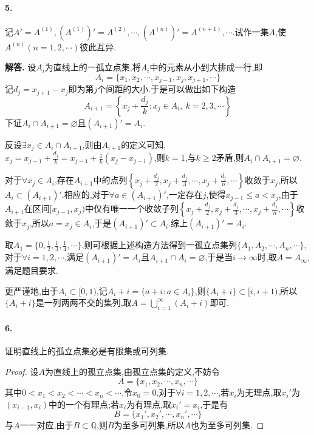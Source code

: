 \documentclass[12pt, a4paper, oneside]{ctexart}
\newenvironment{solution}{\par\noindent\textbf{解答. }}{\bigskip\par}
\begin{document}
\paragraph{5.}记$A'=A^{(1)},(A^{(1)})'=A^{(2)},\cdots,(A^{(n)})'=A^{(n+1)},\cdots$.试作一集$A$,使$A^{(n)}(n=1,2,\cdots)$彼此互异.
\def\disp{\displaystyle}
\begin{solution}
    设$A_i$为直线上的一孤立点集,将$A_i$中的元素从小到大排成一行,即
    \begin{equation*}
      A_i = \{x_1,x_2,\cdots,x_{j-1},x_j,x_{j+1},\cdots\}
    \end{equation*}
    记$d_j = x_{j+1}-x_j$即为第$j$个间距的大小.于是可以做出如下构造
    \begin{equation*}
        A_{i+1} = \left\{x_j+\frac{d_j}{k}:x_j\in A_i,\ k=2,3,\cdots\right\}
    \end{equation*}
    下证$A_i\cap A_{i+1} = \varnothing$且$(A_{i+1})' = A_i$.

    反设$\exists x_j\in A_i\cap A_{i+1}$,则由$A_{i+1}$的定义可知,\ $ x_j=x_{j-1}+\frac{d_j}{k}=x_{j-1}+\frac{1}{k}(x_j-x_{j-1})$,则$k=1$,与$k\geqslant 2$矛盾,则$A_i\cap A_{i+1} = \varnothing$.

    对于$\forall x_j\in A_i$,存在$A_{i+1}$中的点列$\left\{x_j+\frac{d_j}{2},x_j+\frac{d_j}{3},\cdots,x_j+\frac{d_j}{n},\cdots\right\}$收敛于$x_j$,所以$A_i\subset (A_{i+1})'$.相应的,对于$\forall a\in (A_{i+1})'$,一定存在$j$,使得$x_{j-1}\leqslant a < x_j$,由于$A_{i+1}$在区间$[x_{j-1},x_j)$中仅有唯一一个收敛子列$\left\{x_j+\frac{d_j}{2},x_j+\frac{d_j}{3},\cdots,x_j+\frac{d_j}{n},\cdots\right\}$收敛于$x_j$,所以$a = x_j\in A_i$,于是$(A_{i+1})' \subset A_i$.综上$(A_{i+1})' = A_i$.

    取$ A_1 = \{0, \frac{1}{2},\frac{1}{3},\frac{1}{4},\cdots\}$,则可根据上述构造方法得到一孤立点集列$\{A_1,A_2,\cdots, A_n,\cdots\}$,对于$\forall i = 1,2,\cdots$,满足$(A_{i+1})'=A_i$且$A_{i+1}\cap A_i = \varnothing$,于是当$i\rightarrow \infty$时,取$A = A_{\infty}$,满足题目要求.

    更严谨地,由于$A_i\subset [0,1)$,记$A_i+i = \{a+i:a\in A_i\}$,则$\{A_i+i\}\subset [i, i+1)$,所以$\{A_i+i\}$是一列两两不交的集列,取$\disp A = \bigcup_{i=1}^{\infty}(A_i+i)$即可.
\end{solution}
\paragraph{6.}证明直线上的孤立点集必是有限集或可列集.
\begin{proof}
    设$A$为直线上的孤立点集,由孤立点集的定义,不妨令
    \begin{equation*}
        A = \{x_1,x_2,\cdots,x_n,\cdots\}
    \end{equation*}
    其中$0 < x_1 < x_2 < \cdots < x_n<\cdots$,令$x_0 = 0$,对于$\forall i = 1,2,\cdots$,若$x_i$为无理点,取$x_i'$为$(x_{i-1},x_i)$中的一个有理点;若$x_i$为有理点,取$x_i' = x_i$,于是有
    \begin{equation*}
        B = \{x_1', x_2', \cdots, x_n', \cdots\}
    \end{equation*}
    与$A$一一对应,由于$B\subset \mathbb{Q}$,则$B$为至多可列集,所以$A$也为至多可列集.
\end{proof}
\end{document}
